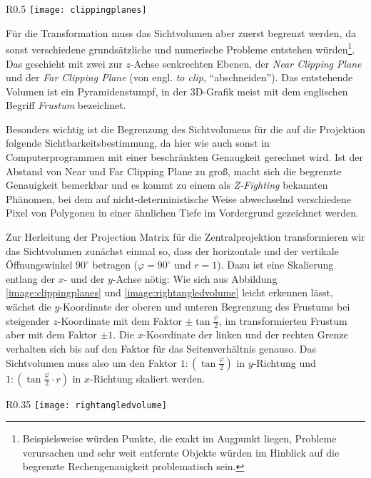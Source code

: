 \begin{wrapfigure}{R}{0.5\textwidth}
  \texttt{[image: clippingplanes]}
  \caption{Near- und Far Clipping Plane.}
  \label{image:clippingplanes}
\end{wrapfigure}

Für die Transformation muss das Sichtvolumen aber zuerst begrenzt werden, da sonst verschiedene grundsätzliche und numerische Probleme entstehen würden\footnote{Beispielsweise würden Punkte, die exakt im Augpunkt liegen, Probleme verursachen und sehr weit entfernte Objekte würden im Hinblick auf die begrenzte Rechengenauigkeit problematisch sein.}. Das geschieht mit zwei zur $z$-Achse senkrechten Ebenen, der \emph{Near Clipping Plane} und der \emph{Far Clipping Plane} (von engl. \emph{to clip}, \enquote{abschneiden}). Das entstehende Volumen ist ein Pyramidenstumpf, in der 3D-Grafik meist mit dem englischen Begriff \emph{Frustum} bezeichnet.

Besonders wichtig ist die Begrenzung des Sichtvolumens für die auf die Projektion folgende Sichtbarkeitsbestimmung, da hier wie auch sonst in Computerprogrammen mit einer beschränkten Genaugkeit gerechnet wird. Ist der Abstand von Near und Far Clipping Plane zu groß, macht sich die begrenzte Genauigkeit bemerkbar und es kommt zu einem als \emph{Z-Fighting} bekannten Phänomen, bei dem auf nicht-deterministische Weise abwechselnd verschiedene Pixel von Polygonen in einer ähnlichen Tiefe im Vordergrund gezeichnet werden.

Zur Herleitung der Projection Matrix für die Zentralprojektion transformieren wir das Sichtvolumen zunächst einmal so, dass der horizontale und der vertikale Öffnungswinkel $90^\circ$ betragen ($\varphi = 90^\circ$ und $r = 1$). Dazu ist eine Skalierung entlang der $x$- und der $y$-Achse nötig: Wie sich aus Abbildung \ref{image:clippingplanes} und \ref{image:rightangledvolume} leicht erkennen lässt, wächst die $y$-Koordinate der oberen und unteren Begrenzung des Frustums bei steigender $z$-Koordinate mit dem Faktor $\pm \tan\frac{\varphi}{2}$, im transformierten Frustum aber mit dem Faktor $\pm 1$. Die $x$-Koordinate der linken und der rechten Grenze verhalten sich bis auf den Faktor für das Seitenverhältnis genauso. Das Sichtvolumen muss also um den Faktor $1 : (\tan\frac{\varphi}{2})$ in $y$-Richtung und $1 : (\tan\frac{\varphi}{2} \cdot r)$ in $x$-Richtung skaliert werden.

\begin{wrapfigure}{R}{0.35\textwidth}
  \texttt{[image: rightangledvolume]}
  \caption{Rechtwinkliges Sichtvolumen mit Projektion auf die Ebene $z=1$.}
  \label{image:rightangledvolume}
\end{wrapfigure}

